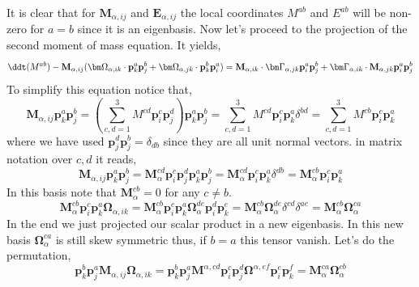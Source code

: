 It is clear that for $\mathbf{M}_{\alpha,ij}$ and $\textbf{E}_{\alpha,ij}$ the local coordinates $M^{ab}$ and $E^{ab}$ will be non-zero for $a=b$ since it is an eigenbasis. 
Now let's proceed to the projection of the second moment of mass equation. 
It yields, 
\begin{align*}
    \ddt (M^{ab})
    - \textbf{M}_{\alpha,ij}(
    \bm\Omega_{\alpha,ik}\cdot\textbf{p}_k^a\textbf{p}_j^b
    + \bm\Omega_{\alpha,jk}\cdot\textbf{p}_k^b\textbf{p}_i^a
    )
    = \textbf{M}_{\alpha,ik} \cdot \bm\Gamma_{\alpha,jk}\textbf{p}_i^a \textbf{p}_j^b
    +  \bm\Gamma_{\alpha,ik} \cdot \textbf{M}_{\alpha,jk}\textbf{p}_i^a \textbf{p}_j^b
\end{align*}
To simplify this equation notice that, 
\begin{equation*}
    \textbf{M}_{\alpha,ij}\textbf{p}_k^a\textbf{p}_j^b
    = (\sum_{c,d=1}^3 M^{cd} \textbf{p}_i^c \textbf{p}_j^d) \textbf{p}_k^a\textbf{p}_j^b
    = \sum_{c,d=1}^3 M^{cd} \textbf{p}_i^c  \textbf{p}_k^a \delta^{bd}
    = \sum_{c,d=1}^3 M^{cb} \textbf{p}_i^c  \textbf{p}_k^a 
\end{equation*}
where we have used $\textbf{p}_j^d \textbf{p}_j^b = \delta_{db}$ since they are all unit normal vectors. 
in matrix notation over $c,d$ it reads, 
\begin{equation*}
    \textbf{M}_{\alpha,ij}\textbf{p}_k^a\textbf{p}_j^b
    = \textbf{M}^{cd}_\alpha \textbf{p}_i^c \textbf{p}_j^d \textbf{p}_k^a\textbf{p}_j^b
    = \textbf{M}^{cd}_\alpha \textbf{p}_i^c \textbf{p}_k^a\delta^{db}
    = \textbf{M}^{cb}_\alpha \textbf{p}_i^c \textbf{p}_k^a
\end{equation*}
In this basis note that $\textbf{M}^{cb}_\alpha = 0$ for any $c\neq b$.
\begin{equation}
    \textbf{M}^{cb}_\alpha \textbf{p}_i^c \textbf{p}_k^a \bm\Omega_{\alpha,ik}
    = 
    \textbf{M}^{cb}_\alpha \textbf{p}_i^c \textbf{p}_k^a 
    \bm\Omega_{\alpha}^{de} \textbf{p}^d_i\textbf{p}^e_k
    = 
    \textbf{M}^{cb}_\alpha  
    \bm\Omega_{\alpha}^{de} 
    \delta^{cd}
    \delta^{ae}
    = 
    \textbf{M}^{cb}_\alpha  
    \bm\Omega_{\alpha}^{ca} 
\end{equation}
In the end we just projected our scalar product in a new eigenbasis. 
In this new basis $\bm\Omega_{\alpha}^{ca}$ is still skew symmetric thus, if $b=a$ 
this tensor vanish. 
Let's do the permutation, 
\begin{equation}
    \textbf{p}_k^b\textbf{p}_j^a 
    \textbf{M}_{\alpha,ij} 
    \bm\Omega_{\alpha,ik} 
    = 
    \textbf{p}_k^b\textbf{p}_j^a 
    \textbf{M}^{\alpha,cd} \textbf{p}_i^c\textbf{p}_j^d
    \bm\Omega^{\alpha,ef} \textbf{p}_i^e\textbf{p}_k^f 
    = 
    \textbf{M}^{ca}_\alpha
    \bm\Omega^{cb}_\alpha
\end{equation}
